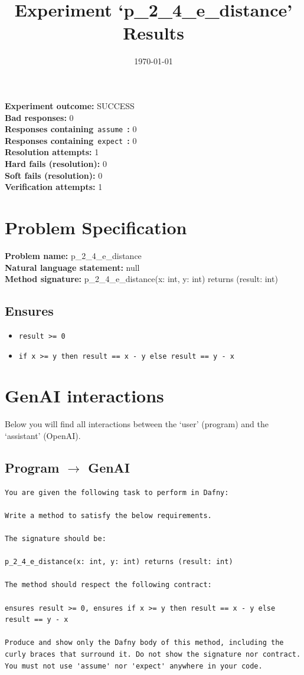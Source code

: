 \documentclass{article}
\begin{document}
\title{Experiment `p\_2\_4\_e\_distance' Results}
\author{\today}
\date{}
\maketitle
\textbf{Experiment outcome: }SUCCESS
\\\textbf{Bad responses: }0
\\\textbf{Responses containing}~\texttt{assume}~\textbf{: }0
\\\textbf{Responses containing}~\texttt{expect}~\textbf{: }0
\\\textbf{Resolution attempts: }1
\\\textbf{Hard fails (resolution): }0
\\\textbf{Soft fails (resolution): }0
\\\textbf{Verification attempts: }1
\section*{Problem Specification}
\textbf{Problem name: }p\_2\_4\_e\_distance
\\\textbf{Natural language statement: }null
\\\textbf{Method signature: }p\_2\_4\_e\_distance(x: int, y: int) returns (result: int)
\subsection*{Ensures}
\begin{itemize}
\item \texttt{result >= 0}
\item \texttt{if x >= y then result == x - y else result == y - x}
\end{itemize}
\clearpage
\section*{GenAI interactions}
Below you will find all interactions between the `user' (program) and the `assistant' (OpenAI).
\subsection*{Program $\rightarrow$ GenAI}
\begin{lstlisting}
You are given the following task to perform in Dafny:

Write a method to satisfy the below requirements.

The signature should be:

p_2_4_e_distance(x: int, y: int) returns (result: int)

The method should respect the following contract:

ensures result >= 0, ensures if x >= y then result == x - y else result == y - x

Produce and show only the Dafny body of this method, including the curly braces that surround it. Do not show the signature nor contract. You must not use 'assume' nor 'expect' anywhere in your code.
\end{lstlisting}
\end{document}
